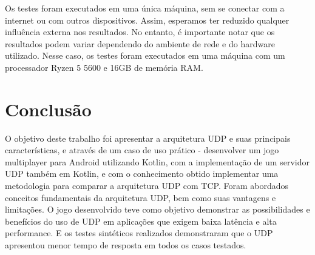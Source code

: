 \documentclass[12pt]{article}
\begin{document}
Os testes foram executados em uma única máquina, sem se conectar com a internet ou com outros dispositivos. Assim, esperamos ter reduzido qualquer influência externa nos resultados. No entanto, é importante notar que os resultados podem variar dependendo do ambiente de rede e do hardware utilizado. Nesse caso, os testes foram executados em uma máquina com um processador Ryzen 5 5600 e 16GB de memória RAM.

\section{Conclusão}
O objetivo deste trabalho foi apresentar a arquitetura UDP e suas principais características, e através de um caso de uso prático - desenvolver um jogo multiplayer para Android utilizando Kotlin, com a implementação de um servidor UDP também em Kotlin, e com o conhecimento obtido implementar uma metodologia para comparar a arquitetura UDP com TCP. 
Foram abordados conceitos fundamentais da arquitetura UDP, bem como suas vantagens e limitações. O jogo desenvolvido teve como objetivo demonstrar as possibilidades e benefícios do uso de UDP em aplicações que exigem baixa latência e alta performance. E os testes sintéticos realizados demonstraram que o UDP apresentou menor tempo de resposta em todos os casos testados.






\end{document}
